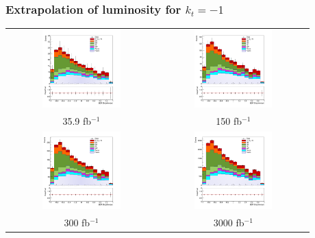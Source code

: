 \documentclass[11pt]{beamer}
\newcommand{\nologo}{\setbeamertemplate{logo}{}}
\begin{document}
{\nologo
	\begin{frame}
	\frametitle{Extrapolation of luminosity for $k_t=-1$}
	\begin{center}
		\begin{tabular}{cc}
			\includegraphics[width=5.5cm,height=3cm]{figures/simple-kt-1.png} &
			\includegraphics[width=5.5cm,height=3cm]{figures/kt-1/150fb/simple-150-kt-1.png}\\ 
			\scriptsize{35.9 fb$^{-1}$} & \scriptsize{150 fb$^{-1}$} \\
			\includegraphics[width=5.5cm,height=3cm]{figures/kt-1/300fb/simple-300-kt-1.png}&
			\includegraphics[width=5.5cm,height=3cm]{figures/kt-1/3000fb/simple-3000-kt-1.png}\\
			\scriptsize{300 fb$^{-1}$} & \scriptsize{3000 fb$^{-1}$} \\
		\end{tabular}
	\end{center}
\end{frame}
}
\end{document}
